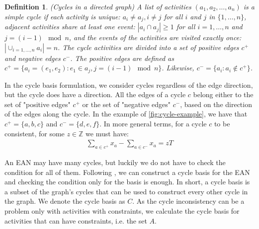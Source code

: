 \documentclass[english, 12pt, a4paper, sci, utf8, a-2b, online]{aaltothesis}
\newtheorem{definition}{Definition}
\newcommand{\Z}{\mathbb{Z}}
\begin{document}
        
%     

\begin{definition}{(Cycles in a directed graph)}
    A list of activities $(a_1, a_2, \dots, a_n)$ is a simple cycle if each activity is unique: $a_i \neq a_j, i \neq j$ for all $i$ and $j$ in $\{1, \dots, n\}$, adjacent activities share at least one event: $|a_i\cap a_{j}| \geq 1$ for all $i = {1, \dots, n}$ and $j = (i - 1 ) \mod n$, and the events of the activities are visited exactly once: $|\cup_{i=1,\dots, n}a_i| = n$. The cycle activities are divided into a set of positive edges $c^+$ and negative edges $c^-$. The positive edges are defined as $c^+ = \{a_i = (e_1, e_2) : e_1 \in a_j, j = (i - 1) \mod n\}$. Likewise, $c^- = \{a_i : a_i \notin c^+\}$.
\end{definition}

In the cycle basis formulation, we consider cycles regardless of the edge direction, but the cycle does have a direction. All the edges of a cycle $c$ belong either to the set of "positive edges" $c^+$ or the set of "negative edges" $c^-$, based on the direction of the edges along the cycle. In the example of \cref{fig:cycle-example}, we have that $c^+ = \{a, b, c\}$ and $c^- = \{d, e, f\}$. In more general terms, for a cycle $c$ to be consistent, for some $z \in \Z$ we must have:
\begin{align}
    \sum_{a\in c^+}x_a - \sum_{a \in c^-}x_a = zT
\end{align}

An EAN may have many cycles, but luckily we do not have to check the condition for all of them. Following \cite{cycle-basis-original-2001}, we can construct a cycle basis for the EAN and checking the condition only for the basis is enough. In short, a cycle basis is a subset of the graph's cycles that can be used to construct every other cycle in the graph. We denote the cycle basis as $C$. As the cycle inconsistency can be a problem only with activities with constraints, we calculate the cycle basis for activities that can have constraints, i.e. the set $A$.
\end{document}
